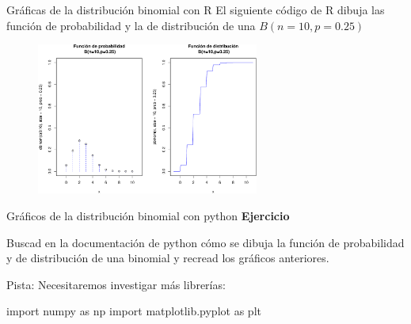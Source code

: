 \documentclass[
  ignorenonframetext,
  aspectratio=169]{beamer}
\newenvironment{Shaded}{\begin{snugshade}}{\end{snugshade}}
\newcommand{\ImportTok}[1]{\textcolor[rgb]{0.00,0.46,0.62}{#1}}
\newcommand{\NormalTok}[1]{\textcolor[rgb]{0.00,0.23,0.31}{#1}}
\begin{document}
\begin{frame}{Gráficas de la distribución binomial con R}
\protect\hypertarget{gruxe1ficas-de-la-distribuciuxf3n-binomial-con-r-1}{}
El siguiente código de R dibuja las función de probabilidad y la de
distribución de una \(B(n=10,p=0.25)\)

\begin{figure}

{\centering \includegraphics[width=0.65\textwidth,height=\textheight]{Tema_3_1_Notables_files/figure-beamer/unnamed-chunk-9-1.pdf}

}

\end{figure}
\end{frame}

\begin{frame}[fragile]{Gráficos de la distribución binomial con python}
\protect\hypertarget{gruxe1ficos-de-la-distribuciuxf3n-binomial-con-python}{}
\textbf{Ejercicio}

Buscad en la documentación de python cómo se dibuja la función de
probabilidad y de distribución de una binomial y recread los gráficos
anteriores.

Pista: Necesitaremos investigar más librerías:

\begin{Shaded}
\begin{Highlighting}[]
\ImportTok{import}\NormalTok{ numpy }\ImportTok{as}\NormalTok{ np}
\ImportTok{import}\NormalTok{ matplotlib.pyplot }\ImportTok{as}\NormalTok{ plt}
\end{Highlighting}
\end{Shaded}
\end{frame}
\end{document}
